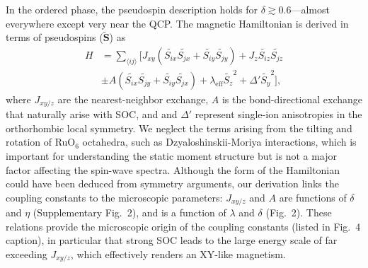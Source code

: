 In the ordered phase, the pseudospin description holds for $\delta\gtrsim0.6$---almost everywhere except very near the QCP. The magnetic Hamiltonian is derived in terms of pseudospins ($\tilde{\mathbf{S}}$) as
\begin{align*}
H &= \sum_{\langle ij\rangle } 
[J_{xy} (\tilde{S_{ix}} \tilde{S_{jx}}+\tilde{S_{iy}} \tilde{S_{jy}}) + J_z \tilde{S_{iz}} \tilde{S_{jz}} \\
&\pm A (\tilde{S_{ix}} \tilde{S_{jy}}+\tilde{S_{iy}} \tilde{S_{jx}}) + \lambda_{\mathrm{eff}} \tilde{S_z}^2 +\Delta' \tilde{S_y}^2],
\end{align*}
\noindent
where $J_{xy/z}$ are the nearest-neighbor exchange, $A$ is the bond-directional exchange that naturally arise with SOC, and \leff and $\Delta'$ represent single-ion anisotropies in the orthorhombic local symmetry. We neglect the terms arising from the tilting and rotation of RuO$_6$ octahedra, such as Dzyaloshinskii-Moriya interactions, which is important for understanding the static moment structure but is not a major factor affecting the spin-wave spectra.  Although the form of the Hamiltonian could have been deduced from symmetry arguments, our derivation %
links the coupling constants to the microscopic parameters: $J_{xy/z}$ and $A$ are functions of $\delta$ and $\eta$ (Supplementary Fig.~2), and \leff is a function of $\lambda$ and $\delta$ (Fig.~2). These relations provide the microscopic origin of the coupling constants (listed in Fig.~4 caption), in particular that strong SOC leads to the large energy scale of \leff far exceeding $J_{xy/z}$, which effectively renders an XY-like magnetism.
  
  